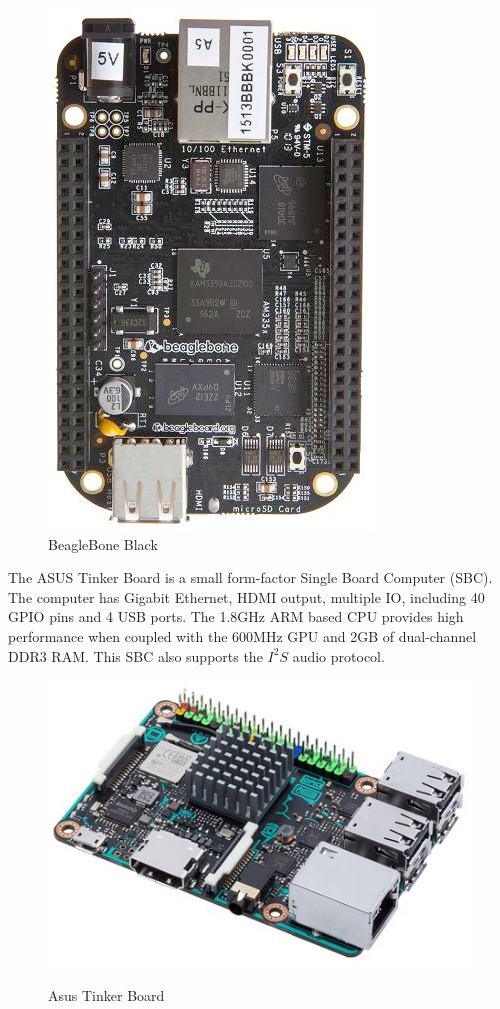 \documentclass[11pt,a4paper,headinclude=false,footinclude=false]{scrreprt}
\begin{document}
\begin{figure}[H]
\includegraphics{BackgroundLitSurvey/BBB.jpg}
\centering
\caption{BeagleBone Black\cite{BBB18}}
\label{BBBFig}
\end{figure}

The ASUS Tinker Board is a small form-factor Single Board Computer
(SBC). The computer has Gigabit Ethernet, HDMI output, multiple IO,
including 40 GPIO pins and 4 USB ports. The 1.8GHz ARM based CPU
provides high performance when coupled with the 600MHz GPU and 2GB of
dual-channel DDR3 RAM. This SBC also supports the \(I^2S\) audio
protocol\cite{Tinker18}.

\begin{figure}[H]
\includegraphics{BackgroundLitSurvey/AsusTB.jpeg}
\centering
\caption{Asus Tinker Board}\cite{Tinker18}
\label{AsusTBFig}
\end{figure}
\end{document}
